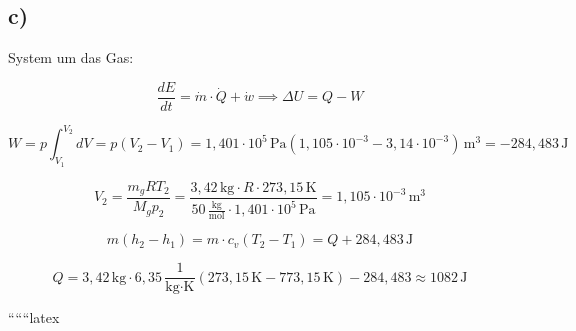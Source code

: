 

\subsection*{c)}

System um das Gas:

\[
\frac{dE}{dt} = \dot{m} \cdot \dot{Q} + \dot{w} \implies \Delta U = Q - W
\]

\[
W = p \int_{V_1}^{V_2} dV = p (V_2 - V_1) = 1,401 \cdot 10^5 \, \text{Pa} (1,105 \cdot 10^{-3} - 3,14 \cdot 10^{-3}) \, \text{m}^3 = -284,483 \, \text{J}
\]

\[
V_2 = \frac{m_g RT_2}{M_g p_2} = \frac{3,42 \, \text{kg} \cdot R \cdot 273,15 \, \text{K}}{50 \, \frac{\text{kg}}{\text{mol}} \cdot 1,401 \cdot 10^5 \, \text{Pa}} = 1,105 \cdot 10^{-3} \, \text{m}^3
\]

\[
m (h_2 - h_1) = m \cdot c_v (T_2 - T_1) = Q + 284,483 \, \text{J}
\]

\[
Q = 3,42 \, \text{kg} \cdot 6,35 \, \frac{1}{\text{kg} \cdot \text{K}} (273,15 \, \text{K} - 773,15 \, \text{K}) - 284,483 \approx 1082 \, \text{J}
\]

``````latex
